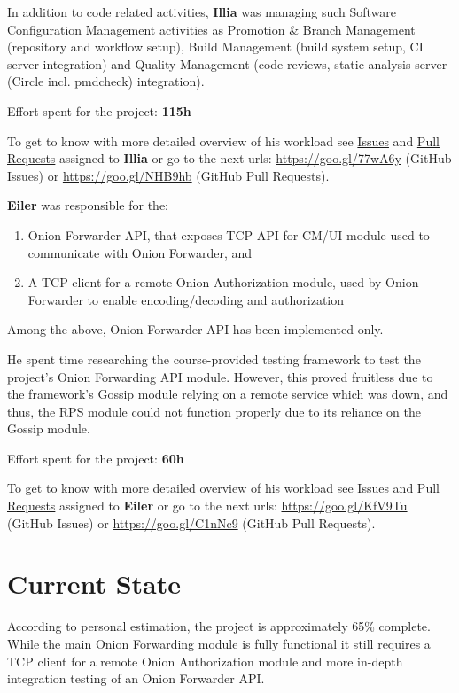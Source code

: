 \documentclass{article}
\begin{document}
In addition to code related activities, \textbf{Illia} was managing such Software Configuration Management activities as Promotion \& Branch Management (repository and workflow setup), Build Management (build system setup, CI server integration) and Quality Management (code reviews, static analysis server (Circle incl. pmdcheck) integration).

Effort spent for the project: \textbf{115h}

To get to know with more detailed overview of his workload see \href{https://goo.gl/77wA6y}{Issues} and \href{https://goo.gl/NHB9hb}{Pull Requests} assigned to \textbf{Illia} or go to the next urls: \url{https://goo.gl/77wA6y} (GitHub Issues) or \url{https://goo.gl/NHB9hb} (GitHub Pull Requests).

\textbf{Eiler} was responsible for the:
\begin{enumerate}
  \item Onion Forwarder API, that exposes TCP API for CM/UI module used to communicate with Onion Forwarder, and 
  \item A TCP client for a remote Onion Authorization module, used by Onion Forwarder to enable encoding/decoding and authorization
\end{enumerate}

Among the above, Onion Forwarder API has been implemented only.

He spent time researching the course-provided testing framework to test the project's Onion Forwarding API module. However, this proved fruitless due to the framework's Gossip module relying on a remote service which was down, and thus, the RPS module could not function properly due to its reliance on the Gossip module.

Effort spent for the project: \textbf{60h}

To get to know with more detailed overview of his workload see \href{https://goo.gl/KfV9Tu}{Issues} and \href{https://goo.gl/C1nNc9}{Pull Requests} assigned to \textbf{Eiler} or go to the next urls: \url{https://goo.gl/KfV9Tu} (GitHub Issues) or \url{https://goo.gl/C1nNc9} (GitHub Pull Requests).

\section{Current State}
According to personal estimation, the project is approximately 65\% complete. While the main Onion Forwarding module is fully functional it still requires a TCP client for a remote Onion Authorization module and more in-depth integration testing of an Onion Forwarder API.
\end{document}
